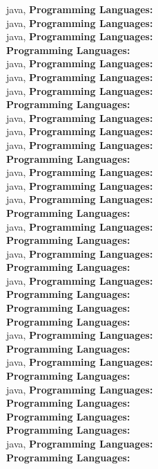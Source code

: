 java, \textbf{Programming Languages:} \\
java, \textbf{Programming Languages:} \\
java, \textbf{Programming Languages:} \\
\textbf{Programming Languages:} \\
java, \textbf{Programming Languages:} \\
java, \textbf{Programming Languages:} \\
java, \textbf{Programming Languages:} \\
\textbf{Programming Languages:} \\
java, \textbf{Programming Languages:} \\
java, \textbf{Programming Languages:} \\
java, \textbf{Programming Languages:} \\
\textbf{Programming Languages:} \\
java, \textbf{Programming Languages:} \\
java, \textbf{Programming Languages:} \\
java, \textbf{Programming Languages:} \\
\textbf{Programming Languages:} \\
java, \textbf{Programming Languages:} \\
\textbf{Programming Languages:} \\
java, \textbf{Programming Languages:} \\
\textbf{Programming Languages:} \\
java, \textbf{Programming Languages:} \\
\textbf{Programming Languages:} \\
\textbf{Programming Languages:} \\
\textbf{Programming Languages:} \\
java, \textbf{Programming Languages:} \\
\textbf{Programming Languages:} \\
java, \textbf{Programming Languages:} \\
\textbf{Programming Languages:} \\
java, \textbf{Programming Languages:} \\
\textbf{Programming Languages:} \\
\textbf{Programming Languages:} \\
\textbf{Programming Languages:} \\
java, \textbf{Programming Languages:} \\
\textbf{Programming Languages:} \\
